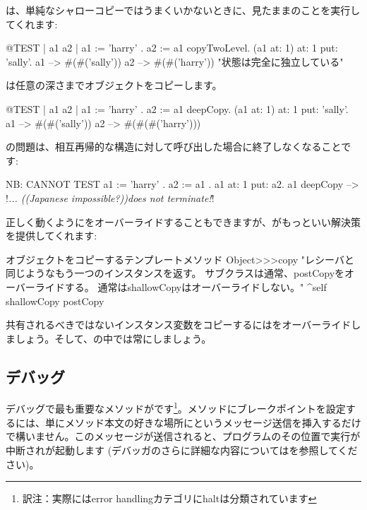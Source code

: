\documentclass[a4paper,10pt,twoside]{book}
\begin{document}
は、単純なシャローコピーではうまくいかないときに、見たままのことを実行してくれます:

\begin{code}{@TEST | a1 a2 |}
a1 := { { 'harry' } } .
a2 := a1 copyTwoLevel.
(a1 at: 1) at: 1 put: 'sally'.
a1 --> #(#('sally'))
a2 --> #(#('harry'))    "状態は完全に独立している"
\end{code}

は任意の深さまでオブジェクトをコピーします。

\begin{code}{@TEST | a1 a2 |}
a1 := { { { 'harry' } } } .
a2 := a1 deepCopy.
(a1 at: 1) at: 1 put: 'sally'.
a1 --> #(#('sally'))
a2 --> #(#(#('harry')))
\end{code}

の問題は、相互再帰的な構造に対して呼び出した場合に終了しなくなることです:

\begin{code}{NB: CANNOT TEST}
a1 := { 'harry' }.
a2 := { a1 }.
a1 at: 1 put: a2.
a1 deepCopy --> !\emph{... ((Japanese impossible?))does not terminate!}!
\end{code}

正しく動くようにをオーバーライドすることもできますが、がもっといい解決策を提供してくれます:

\begin{method}{オブジェクトをコピーするテンプレートメソッド}
Object>>>copy
    "レシーバと同じようなもう一つのインスタンスを返す。
    サブクラスは通常、postCopyをオーバーライドする。
    通常はshallowCopyはオーバーライドしない。"
    ^self shallowCopy postCopy
\end{method}

共有されるべきではないインスタンス変数をコピーするにはをオーバーライドしましょう。そして、の中では常にしましょう。


\subsection{デバッグ}

デバッグで最も重要なメソッドがです\footnote{訳注：実際にはerror handlingカテゴリにhaltは分類されています}。メソッドにブレークポイントを設定するには、単にメソッド本文の好きな場所にというメッセージ送信を挿入するだけで構いません。このメッセージが送信されると、プログラムのその位置で実行が中断されが起動します
(デバッガのさらに詳細な内容についてはを参照してください)。
\end{document}
